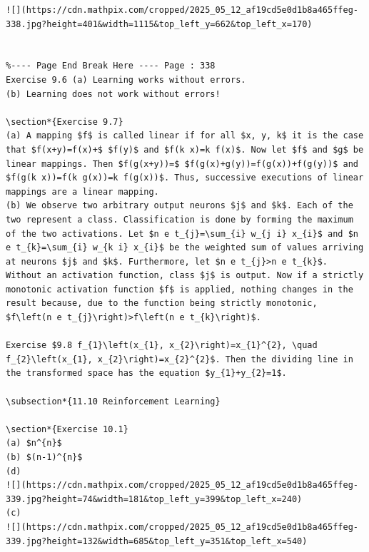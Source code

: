 \documentclass[10pt]{article}
\begin{document}
\begin{verbatim}
![](https://cdn.mathpix.com/cropped/2025_05_12_af19cd5e0d1b8a465ffeg-338.jpg?height=401&width=1115&top_left_y=662&top_left_x=170)


%---- Page End Break Here ---- Page : 338
Exercise 9.6 (a) Learning works without errors.
(b) Learning does not work without errors!

\section*{Exercise 9.7}
(a) A mapping $f$ is called linear if for all $x, y, k$ it is the case that $f(x+y)=f(x)+$ $f(y)$ and $f(k x)=k f(x)$. Now let $f$ and $g$ be linear mappings. Then $f(g(x+y))=$ $f(g(x)+g(y))=f(g(x))+f(g(y))$ and $f(g(k x))=f(k g(x))=k f(g(x))$. Thus, successive executions of linear mappings are a linear mapping.
(b) We observe two arbitrary output neurons $j$ and $k$. Each of the two represent a class. Classification is done by forming the maximum of the two activations. Let $n e t_{j}=\sum_{i} w_{j i} x_{i}$ and $n e t_{k}=\sum_{i} w_{k i} x_{i}$ be the weighted sum of values arriving at neurons $j$ and $k$. Furthermore, let $n e t_{j}>n e t_{k}$. Without an activation function, class $j$ is output. Now if a strictly monotonic activation function $f$ is applied, nothing changes in the result because, due to the function being strictly monotonic, $f\left(n e t_{j}\right)>f\left(n e t_{k}\right)$.

Exercise $9.8 f_{1}\left(x_{1}, x_{2}\right)=x_{1}^{2}, \quad f_{2}\left(x_{1}, x_{2}\right)=x_{2}^{2}$. Then the dividing line in the transformed space has the equation $y_{1}+y_{2}=1$.

\subsection*{11.10 Reinforcement Learning}

\section*{Exercise 10.1}
(a) $n^{n}$
(b) $(n-1)^{n}$
(d)
![](https://cdn.mathpix.com/cropped/2025_05_12_af19cd5e0d1b8a465ffeg-339.jpg?height=74&width=181&top_left_y=399&top_left_x=240)
(c)
![](https://cdn.mathpix.com/cropped/2025_05_12_af19cd5e0d1b8a465ffeg-339.jpg?height=132&width=685&top_left_y=351&top_left_x=540)


\end{verbatim}
\end{document}
